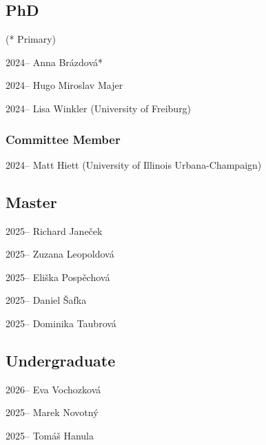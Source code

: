 \documentclass[12pt,a4paper]{report}
\begin{document}
    \subsection*{PhD}
    (* Primary)

    \begin{tablist}

        \item[2024--] \tab{}Anna Brázdová*
        \item[2024--] \tab{}Hugo Miroslav Majer
        \item[2024--] \tab{}Lisa Winkler (University of Freiburg)

    \end{tablist}

    \subsubsection*{Committee Member}

    \begin{tablist}

        \item[2024--] \tab{}Matt Hiett (University of Illinois Urbana-Champaign)

    \end{tablist}

    \subsection*{Master}

    \begin{tablist}

        \item[2025--] \tab{}Richard Janeček
        \item[2025--] \tab{}Zuzana Leopoldová
        \item[2025--] \tab{}Eliška Pospěchová
        \item[2025--] \tab{}Daniel Šafka
        \item[2025--] \tab{}Dominika Taubrová

    \end{tablist}

    \subsection*{Undergraduate}

    \begin{tablist}

        \item[2026--] \tab{}Eva Vochozková
        \item[2025--] \tab{}Marek Novotný
        \item[2025--] \tab{}Tomáš Hanula

    \end{tablist}
\end{document}
